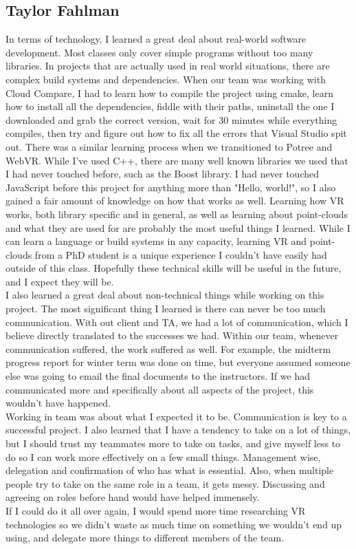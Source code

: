 \documentclass[draftclsnofoot,onecolumn]{IEEEtran}
\begin{document}
\subsection{Taylor Fahlman}

In terms of technology, I learned a great deal about real-world software development. Most classes only cover simple programs without too many libraries.
In projects that are actually used in real world situations, there are complex build systems and dependencies. When our team was working with Cloud Compare,
I had to learn how to compile the project using cmake, learn how to install all the dependencies, fiddle with their paths, uninstall the one I downloaded and grab
the correct version, wait for 30 minutes while everything compiles, then try and figure out how to fix all the errors that Visual Studio spit out. There was a similar
learning process when we transitioned to Potree and WebVR. While I've used C++, there are many well known libraries we used that I had never touched before, such as
the Boost library. I had never touched JavaScript before this project for anything more than "Hello, world!", so I also gained a fair amount of knowledge on how that works
as well. Learning how VR works, both library specific and in general, as well as learning about point-clouds and what they are used for are probably the most useful things
I learned. While I can learn a language or build systems in any capacity, learning VR and point-clouds from a PhD student is a unique experience I couldn't have easily
had outside of this class. Hopefully these technical skills will be useful in the future, and I expect they will be.\\ 

I also learned a great deal about non-technical things while working on this project. The most significant thing I learned is there can never be too much communication.
With out client and TA, we had a lot of communication, which I believe directly translated to the successes we had. Within our team, whenever communication suffered, the work suffered
as well. For example, the midterm progress report for winter term was done on time, but everyone assumed someone else was going to email the final documents to the instructors. If we
had communicated more and specifically about all aspects of the project, this wouldn't have happened.\\

Working in team was about what I expected it to be. Communication is key to a successful project. I also learned that I have a tendency to take on a lot of things, but I should
trust my teammates more to take on tasks, and give myself less to do so I can work more effectively on a few small things. Management wise, delegation and confirmation of who has what is essential. Also, when multiple people try to take on the same role in a team, it gets messy. Discussing and agreeing on roles before hand would have helped immensely.\\
If I could do it all over again, I would spend more time researching VR technologies so we didn't waste as much time on something we wouldn't end up using, and delegate more things to different members of the team.
\end{document}
